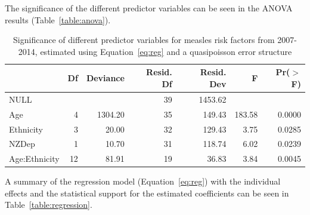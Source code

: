 \documentclass{article}
\begin{document}
The significance of the different predictor variables can be seen in the ANOVA results (Table~\autoref{table:anova}).
\par
\vspace{5mm} %
\begin{table}
\begin{tabular}{lrrrrrr}
  \hline
 & Df & Deviance & Resid. Df & Resid. Dev & F & Pr($>$F) \\ 
  \hline
NULL &  &  & 39 & 1453.62 &  &  \\ 
  Age & 4 & 1304.20 & 35 & 149.43 & 183.58 & 0.0000 \\ 
  Ethnicity & 3 & 20.00 & 32 & 129.43 & 3.75 & 0.0285 \\ 
  NZDep & 1 & 10.70 & 31 & 118.74 & 6.02 & 0.0239 \\ 
  Age:Ethnicity & 12 & 81.91 & 19 & 36.83 & 3.84 & 0.0045 \\ 
   \hline
\end{tabular}\caption{Significance of different predictor variables for measles risk factors from 2007-2014, estimated using Equation~\autoref{eq:reg} and a quasipoisson error structure}
\label{table:anova}
\end{table}
\vspace{5mm} %

A summary of the regression model (Equation~\autoref{eq:reg}) with the individual effects and the statistical support for the estimated coefficients can be seen in Table~\autoref{table:regression}.
\end{document}
